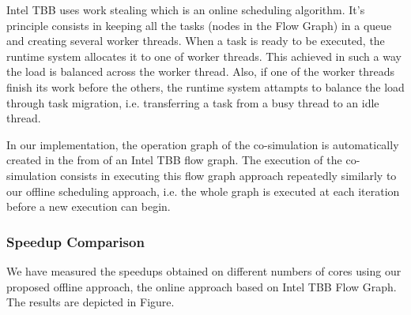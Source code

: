 Intel TBB uses work stealing which is an online scheduling algorithm. It's principle consists in keeping all the tasks (nodes in the Flow Graph) in a queue and creating several worker threads. When a task is ready to be executed, the runtime system allocates it to one of worker threads. This achieved in such a way the load is balanced across the worker thread. Also, if one of the worker threads finish its work before the others, the runtime system attampts to balance the load through task migration, i.e. transferring a task from a busy thread to an idle thread.

In our implementation, the operation graph of the co-simulation is automatically created in the from of an Intel TBB flow graph. The execution of the co-simulation consists in executing this flow graph approach repeatedly similarly to our offline scheduling approach, i.e. the whole graph is executed at each iteration before a new execution can begin.

\subsubsection{Speedup Comparison}

We have measured the speedups obtained on different numbers of cores using our proposed offline approach, the online approach based on Intel TBB Flow Graph. The results are depicted in Figure.


